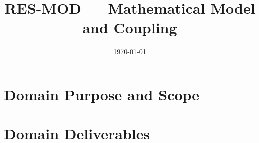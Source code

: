 \documentclass[12pt,a4paper]{article}
\title{RES-MOD --- Mathematical Model and Coupling}
\author{}
\date{\today}
\begin{document}
\maketitle

\tableofcontents
\clearpage

\section{Domain Purpose and Scope}
\label{sec:res-mod-domain-purpose}


\section{Domain Deliverables}
\label{sec:res-mod-domain-deliverables}










\clearpage
\printbibliography[
  heading=bibintoc,
  title={References}
]
\end{document}
